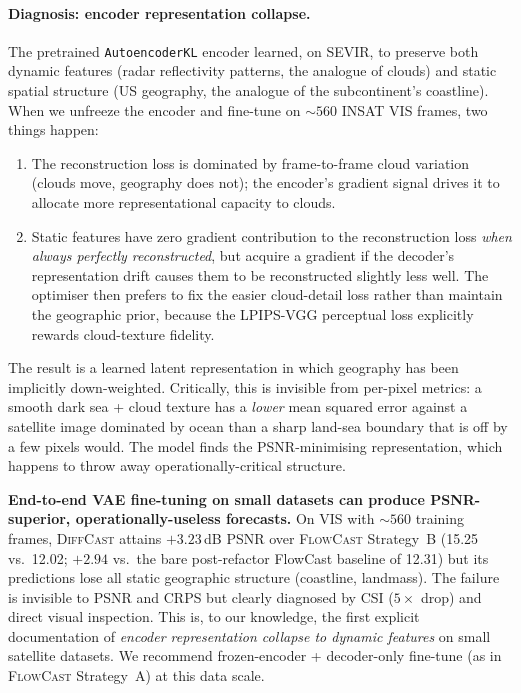 \documentclass[11pt,a4paper]{article}
\begin{document}
\paragraph{Diagnosis: encoder representation collapse.} The pretrained
\texttt{AutoencoderKL} encoder learned, on {SEVIR}, to preserve both
dynamic features (radar reflectivity patterns, the analogue of clouds)
and static spatial structure (US geography, the analogue of the
subcontinent's coastline). When we unfreeze the encoder and fine-tune on
$\sim 560$ INSAT VIS frames, two things happen:

\begin{enumerate}[leftmargin=*]
\item The reconstruction loss is dominated by frame-to-frame cloud variation
      (clouds move, geography does not); the encoder's gradient signal
      drives it to allocate more representational capacity to clouds.
\item Static features have zero gradient contribution to the reconstruction
      loss \emph{when always perfectly reconstructed}, but acquire a
      gradient if the decoder's representation drift causes them to be
      reconstructed slightly less well. The optimiser then prefers to fix
      the easier cloud-detail loss rather than maintain the geographic
      prior, because the LPIPS-VGG perceptual loss explicitly rewards
      cloud-texture fidelity.
\end{enumerate}

The result is a learned latent representation in which geography has been
implicitly down-weighted. Critically, this is invisible from per-pixel
metrics: a smooth dark sea + cloud texture has a \emph{lower} mean
squared error against a satellite image dominated by ocean than a sharp
land-sea boundary that is off by a few pixels would. The model finds the
PSNR-minimising representation, which happens to throw away
operationally-critical structure.

\begin{negfind}
\textbf{End-to-end VAE fine-tuning on small datasets can produce
PSNR-superior, operationally-useless forecasts.} On VIS with $\sim 560$
training frames, \textsc{DiffCast} attains $+3.23$\,dB PSNR over
\textsc{FlowCast} Strategy~B (15.25 vs.\ 12.02; $+2.94$ vs.\ the bare
post-refactor FlowCast baseline of 12.31) but its predictions lose all
static geographic structure (coastline, landmass). The failure is invisible to PSNR and CRPS but
clearly diagnosed by CSI ($5\!\times$ drop) and direct visual inspection.
This is, to our knowledge, the first explicit documentation of
\emph{encoder representation collapse to dynamic features} on small
satellite datasets. We recommend frozen-encoder + decoder-only fine-tune
(as in \textsc{FlowCast} Strategy~A) at this data scale.
\end{negfind}
\end{document}
